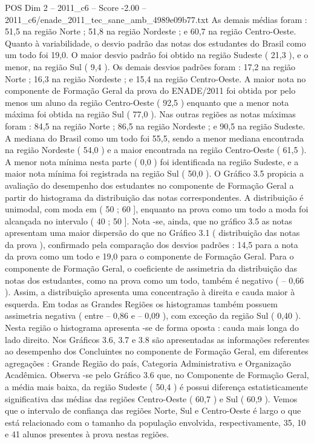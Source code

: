 \begin{textsample}{POS Dim 2 – 2011\_c6 – Score -2.00 – 2011\_c6/enade\_2011\_tec\_sane\_amb\_4989e09b77.txt}
As demais médias foram : 51,5 na região Norte ; 51,8 na região Nordeste ; e 60,7 na região Centro-Oeste.
Quanto à variabilidade, o desvio padrão das notas dos estudantes do Brasil como um todo foi 19,0.
O maior desvio padrão foi obtido na região Sudeste ( 21,3 ), e o menor, na região Sul ( 9,4 ).
Os demais desvios padrões foram : 17,2 na região Norte ; 16,3 na região Nordeste ; e 15,4 na região Centro-Oeste.
A maior nota no componente de Formação Geral da prova do ENADE/2011 foi obtida por pelo menos um aluno da região Centro-Oeste ( 92,5 ) enquanto que a menor nota máxima foi obtida na região Sul ( 77,0 ).
Nas outras regiões as notas máximas foram : 84,5 na região Norte ; 86,5 na região Nordeste ; e 90,5 na região Sudeste.
A mediana do Brasil como um todo foi 55,5, sendo a menor mediana encontrada na região Nordeste ( 54,0 ) e a maior encontrada na região Centro-Oeste ( 61,5 ).
A menor nota mínima nesta parte ( 0,0 ) foi identificada na região Sudeste, e a maior nota mínima foi registrada na região Sul ( 50,0 ).
O Gráfico 3.5 propicia a avaliação do desempenho dos estudantes no componente de Formação Geral a partir do histograma da distribuição das notas correspondentes.
A distribuição é unimodal, com moda em ( 50 ; 60 ], enquanto na prova como um todo a moda foi alcançada no intervalo ( 40 ; 50 ].
Nota -se, ainda, que no gráfico 3.5 as notas apresentam uma maior dispersão do que no Gráfico 3.1 ( distribuição das notas da prova ), confirmado pela comparação dos desvios padrões : 14,5 para a nota da prova como um todo e 19,0 para o componente de Formação Geral.
Para o componente de Formação Geral, o coeficiente de assimetria da distribuição das notas dos estudantes, como na prova como um todo, também é negativo ( – 0,66 ).
Assim, a distribuição apresenta uma concentração à direita e cauda maior à esquerda.
Em todas as Grandes Regiões os histogramas também possuem assimetria negativa ( entre – 0,86 e – 0,09 ), com exceção da região Sul ( 0,40 ).
Nesta região o histograma apresenta -se de forma oposta : cauda mais longa do lado direito.
Nos Gráficos 3.6, 3.7 e 3.8 são apresentadas as informações referentes ao desempenho dos Concluintes no componente de Formação Geral, em diferentes agregações : Grande Região do país, Categoria Administrativa e Organização Acadêmica.
Observa -se pelo Gráfico 3.6 que, no Componente de Formação Geral, a média mais baixa, da região Sudeste ( 50,4 ) é possui diferença estatisticamente significativa das médias das regiões Centro-Oeste ( 60,7 ) e Sul ( 60,9 ).
Vemos que o intervalo de confiança das regiões Norte, Sul e Centro-Oeste é largo o que está relacionado com o tamanho da população envolvida, respectivamente, 35, 10 e 41 alunos presentes à prova nestas regiões.

\end{textsample}
